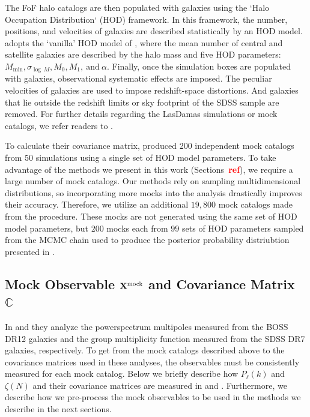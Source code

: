 \documentclass[12pt, letterpaper, preprint]{aastex}
\newcommand{\todo}[1]{{\bf \textcolor{red}{#1}}}
\begin{document}
The FoF halo catalogs are then populated with galaxies using the 
`Halo Occupation Distribution` (HOD) framework. In this framework, the 
number, positions, and velocities of galaxies are described statistically 
by an HOD model. \cite{sinha2017a} adopts the `vanilla' HOD model of \cite{zheng2007}, 
where the mean number of central and satellite galaxies are described by 
the halo mass and five HOD parameters: $M_\mathrm{min}, 
\sigma_{\log\,M} , M_0, M_1,~\mathrm{and}~\alpha$. Finally, once the 
simulation boxes are populated with galaxies, observational systematic 
effects are imposed. The peculiar velocities of galaxies are used to 
impose redshift-space distortions. And galaxies that lie outside the redshift
limits or sky footprint of the SDSS sample are removed. For further 
details regarding the LasDamas simulations or mock catalogs, we refer
readers to \cite{sinha2017a}.

To calculate their covariance matrix, \cite{sinha2017a} produced 200 
independent mock catalogs from 50 simulations using a single set of 
HOD model parameters. To take advantage of the methods we present 
in this work (Sections~\todo{ref}), we require a large number of 
mock catalogs. Our methods rely on sampling multidimensional distributions, 
so incorporating more mocks into the analysis drastically improves their 
accuracy. Therefore, we utilize an additional $19,800$ mock catalogs 
made from the procedure. These mocks are not generated using 
the same set of HOD model parameters, but $200$ mocks each from $99$ 
sets of HOD parameters sampled from the MCMC chain used to produce 
the posterior probability distriubtion presented in \cite{sinha2017a}. 

\subsection{Mock Observable ${\bf X}^\mathrm{mock}$ and Covariance Matrix $\mathbb{C}$} \label{sec:xmock}
In \cite{beutler2017} and \cite{sinha2017a} they analyze the powerspectrum multipoles 
measured from the BOSS DR12 galaxies and the group multiplicity 
function measured from the SDSS DR7 galaxies, respectively. To get from the mock 
catalogs described above to the covariance matrices used in these 
analyses, the observables must be consistently measured for each mock 
catalog. Below we briefly describe how $P_\ell(k)$ and $\zeta(N)$ 
and their covariance matrices are measured in \cite{beutler2017} 
and \cite{sinha2017a}. Furthermore, we describe how we pre-process
the mock observables to be used in the methods we describe in the 
next sections.
\end{document}
